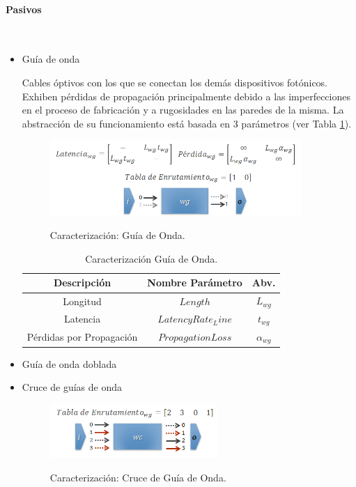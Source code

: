 \paragraph{Pasivos}~\\
\begin{itemize}
\item Guía de onda

Cables óptivos con los que se conectan los demás dispositivos fotónicos. Exhiben 
pérdidas de propagación principalmente debido a las imperfecciones en el proceso
de fabricación y a rugosidades en las paredes de la misma.
La abstracción de su funcionamiento está basada en 3 parámetros \cite{Chan2011} 
(ver Tabla \ref{tb:wg_params}).

\begin{figure}[H]
\caption{Caracterización: Guía de Onda.}
\centering
\includegraphics[width=0.9\textwidth,natwidth=665,natheight=200]{figs/wg.png}
\label{fig:phoenix_wg}
\end{figure}

\begin{table}[H]
\centering
\begin{tabular}{|c|c|c|}
\hline
Descripción &  Nombre Parámetro & Abv. \\
\hline
Longitud & $Length$ & $L_{wg}$ \\
Latencia & $LatencyRate_Line$ & $t_{wg}$ \\
Pérdidas por Propagación & $PropagationLoss$ & $\alpha_{wg}$ \\
\hline
\end{tabular}
\caption{Caracterización Guía de Onda.}
\label{tb:wg_params}
\end{table} 

\item Guía de onda doblada

\item Cruce de guías de onda
\begin{figure}[H]
\caption{Caracterización: Cruce de Guía de Onda.}
\centering
\includegraphics[width=0.6\textwidth,natwidth=430,natheight=139]{figs/wgcross.png}
\label{fig:phoenix_wgc}
\end{figure}

\end{itemize}

